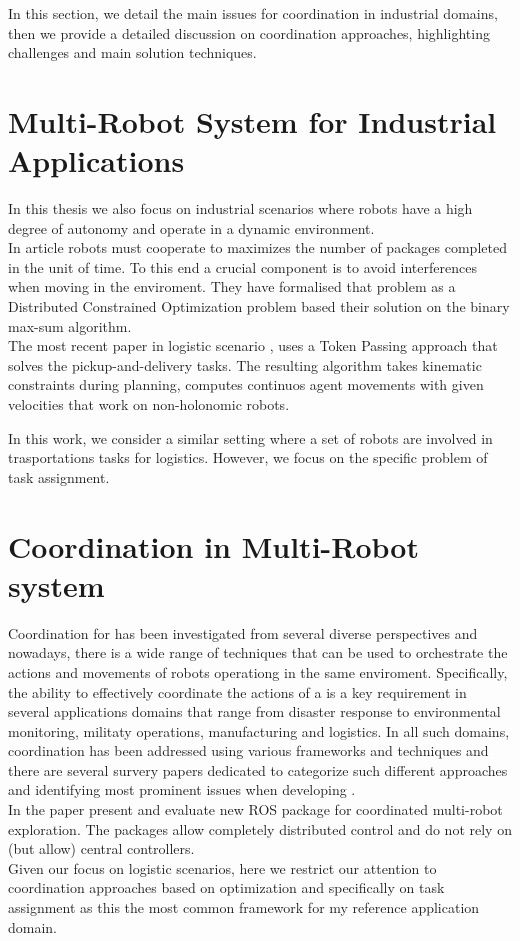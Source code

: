 In this section, we detail the main issues for \mrs coordination 
in industrial domains, then we provide a detailed discussion on coordination
approaches, highlighting challenges and main solution techniques.

\section{Multi-Robot System for Industrial Applications}
In this thesis we also focus on industrial scenarios where robots have a high
degree of autonomy and operate in a dynamic environment.
\\
In article \cite{maxsum} robots must cooperate to maximizes the number of packages
completed in the unit of time. To this end a crucial component is to avoid interferences
when moving in the enviroment. They have formalised that problem as a Distributed 
Constrained Optimization problem based their solution on the binary max-sum algorithm.
\\
The most recent paper in logistic scenario \cite{mapd}, uses a Token Passing approach 
that solves the pickup-and-delivery tasks. The resulting algorithm takes kinematic 
constraints during planning, computes continuos agent movements with given velocities
that work on non-holonomic robots.

In this work, we consider a similar setting where a set of robots are involved
in trasportations tasks for logistics. However, we focus on the specific problem
of task assignment.

\section{Coordination in Multi-Robot system}
Coordination for \mrs has been investigated from several diverse
perspectives and nowadays, there is a wide range of techniques that can be used to 
orchestrate the actions and movements of robots operationg in the same enviroment.
Specifically, the ability to effectively coordinate the actions of a \mrs is a key 
requirement in several applications domains that range from disaster response to 
environmental monitoring, militaty operations, manufacturing and logistics. 
In all such domains, coordination has been addressed using various frameworks and 
techniques and there are several survery papers dedicated to categorize such different
approaches and identifying most prominent issues when developing \mrs.
\\
In the paper \cite{cooros} present and evaluate new ROS package for coordinated 
multi-robot exploration. The packages allow completely distributed control and do 
not rely on (but allow) central controllers.
\\
Given our focus on logistic scenarios, here we restrict our attention to coordination
approaches based on optimization and specifically on task assignment as this the most 
common framework for my reference application domain.